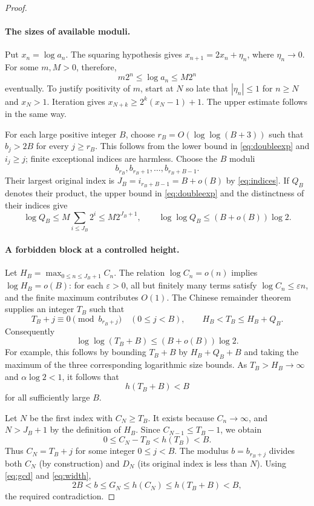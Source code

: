 \documentclass[11pt]{article}
\begin{document}
\begin{proof}
\paragraph{The sizes of available moduli.}
Put $x_n=\log a_n$. The squaring hypothesis gives
$x_{n+1}=2x_n+\eta_n$, where $\eta_n\to0$.
For some $m,M>0$, therefore,
\begin{equation}\label{eq:doubleexp}
 m2^n\le\log a_n\le M2^n
\end{equation}
eventually. To justify positivity of $m$, start at $N$ so late that
$|\eta_n|\le1$ for $n\ge N$ and $x_N>1$.
Iteration gives $x_{N+k}\ge2^k(x_N-1)+1$.
The upper estimate follows in the same way.

For each large positive integer $B$, choose
$r_B=O(\log\log(B+3))$ such that $b_j>2B$ for every $j\ge r_B$.
This follows from the lower bound in \eqref{eq:doubleexp} and $i_j\ge j$;
finite exceptional indices are harmless. Choose the $B$ moduli
\[
 b_{r_B},b_{r_B+1},\ldots,b_{r_B+B-1}.
\]
Their largest original index is
$J_B=i_{r_B+B-1}=B+o(B)$ by \eqref{eq:indices}.
If $Q_B$ denotes their product, the upper bound in \eqref{eq:doubleexp}
and the distinctness of their indices give
\[
 \log Q_B\le M\sum_{i\le J_B}2^i\le M2^{J_B+1},
 \qquad
 \log\log Q_B\le(B+o(B))\log2.
\]

\paragraph{A forbidden block at a controlled height.}
Let $H_B=\max_{0\le n\le J_B+1}C_n$.
The relation $\log C_n=o(n)$ implies $\log H_B=o(B)$: for each
$\varepsilon>0$, all but finitely many terms satisfy
$\log C_n\le\varepsilon n$, and the finite maximum contributes $O(1)$.
The Chinese remainder theorem supplies an integer $T_B$ such that
\[
 T_B+j\equiv0\pmod{b_{r_B+j}}\quad(0\le j<B),
 \qquad H_B<T_B\le H_B+Q_B.
\]
Consequently
\[
 \log\log(T_B+B)\le(B+o(B))\log2.
\]
For example, this follows by bounding $T_B+B$ by $H_B+Q_B+B$ and
taking the maximum of the three corresponding logarithmic size bounds.
As $T_B>H_B\to\infty$ and $\alpha\log2<1$, it follows that
\begin{equation}\label{eq:width}
 h(T_B+B)<B
\end{equation}
for all sufficiently large $B$.

Let $N$ be the first index with $C_N\ge T_B$.
It exists because $C_n\to\infty$, and $N>J_B+1$ by the definition
of $H_B$. Since $C_{N-1}\le T_B-1$, we obtain
\[
 0\le C_N-T_B<h(T_B)<B.
\]
Thus $C_N=T_B+j$ for some integer $0\le j<B$.
The modulus $b=b_{r_B+j}$ divides both $C_N$ (by construction) and
$D_N$ (its original index is less than $N$). Using \eqref{eq:gcd}
and \eqref{eq:width},
\[
 2B<b\le G_N\le h(C_N)\le h(T_B+B)<B,
\]
the required contradiction.
\end{proof}
\end{document}
